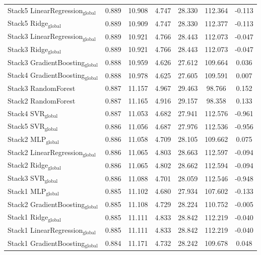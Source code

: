\begin{table}[tp]
{\begin{tabular}{p{4.5cm}cccccc}
        Stack5 LinearRegression$_{\text{global}}$ & 0.889 & 10.908 & 4.747 & 28.330 & 112.364 & -0.113 \\
        Stack5 Ridge$_{\text{global}}$ & 0.889 & 10.909 & 4.747 & 28.330 & 112.377 & -0.113 \\
        Stack3 LinearRegression$_{\text{global}}$ & 0.889 & 10.921 & 4.766 & 28.443 & 112.073 & -0.047 \\
        Stack3 Ridge$_{\text{global}}$ & 0.889 & 10.921 & 4.766 & 28.443 & 112.073 & -0.047 \\
        Stack3 GradientBoosting$_{\text{global}}$ & 0.888 & 10.959 & 4.626 & 27.612 & 109.664 & 0.036 \\
        Stack4 GradientBoosting$_{\text{global}}$ & 0.888 & 10.978 & 4.625 & 27.605 & 109.591 & 0.007 \\
        Stack3 RandomForest & 0.887 & 11.157 & 4.967 & 29.463 & 98.766 & 0.152 \\
        Stack2 RandomForest & 0.887 & 11.165 & 4.916 & 29.157 & 98.358 & 0.133 \\
        Stack4 SVR$_{\text{global}}$ & 0.887 & 11.053 & 4.682 & 27.941 & 112.576 & -0.961 \\
        Stack5 SVR$_{\text{global}}$ & 0.886 & 11.056 & 4.687 & 27.976 & 112.536 & -0.956 \\
        Stack2 MLP$_{\text{global}}$ & 0.886 & 11.058 & 4.709 & 28.105 & 109.662 & 0.075 \\
        Stack2 LinearRegression$_{\text{global}}$ & 0.886 & 11.065 & 4.803 & 28.663 & 112.597 & -0.094 \\
        Stack2 Ridge$_{\text{global}}$ & 0.886 & 11.065 & 4.802 & 28.662 & 112.594 & -0.094 \\
        Stack3 SVR$_{\text{global}}$ & 0.886 & 11.088 & 4.701 & 28.059 & 112.546 & -0.948 \\
        Stack1 MLP$_{\text{global}}$ & 0.885 & 11.102 & 4.680 & 27.934 & 107.602 & -0.133 \\
        Stack2 GradientBoosting$_{\text{global}}$ & 0.885 & 11.108 & 4.729 & 28.224 & 110.752 & -0.005 \\
        Stack1 Ridge$_{\text{global}}$ & 0.885 & 11.111 & 4.833 & 28.842 & 112.219 & -0.040 \\
        Stack1 LinearRegression$_{\text{global}}$ & 0.885 & 11.111 & 4.833 & 28.842 & 112.219 & -0.040 \\
        Stack1 GradientBoosting$_{\text{global}}$ & 0.884 & 11.171 & 4.732 & 28.242 & 109.678 & 0.048 \\

\end{tabular}}
\end{table}
